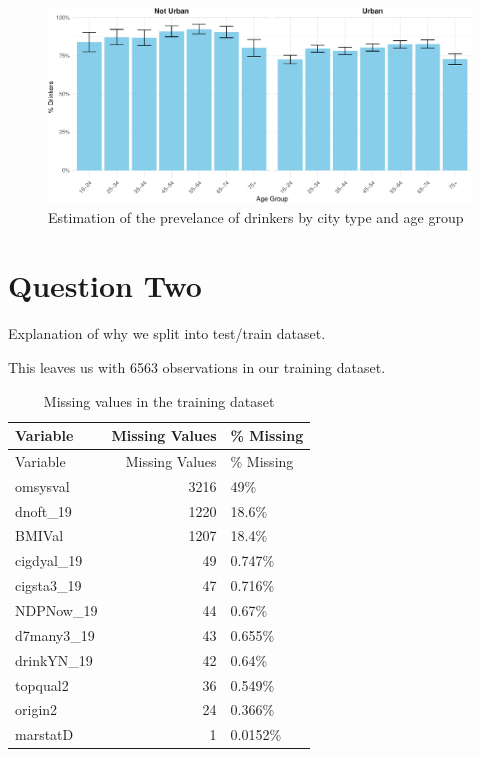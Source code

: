 \documentclass[
  11pt,
]{article}
\begin{document}
\begin{figure}
\centering
\includegraphics{Coursework_files/figure-latex/output prevelance plot-1.pdf}
\caption{Estimation of the prevelance of drinkers by city type and age
group}
\end{figure}

\section{Question Two}\label{question-two}

Explanation of why we split into test/train dataset.

This leaves us with 6563 observations in our training dataset.

\begin{longtable}[]{@{}lrl@{}}
\caption{Missing values in the training dataset}\tabularnewline
\toprule\noalign{}
Variable & Missing Values & \% Missing \\
\midrule\noalign{}
\endfirsthead
\toprule\noalign{}
Variable & Missing Values & \% Missing \\
\midrule\noalign{}
\endhead
\bottomrule\noalign{}
\endlastfoot
omsysval & 3216 & 49\% \\
dnoft\_19 & 1220 & 18.6\% \\
BMIVal & 1207 & 18.4\% \\
cigdyal\_19 & 49 & 0.747\% \\
cigsta3\_19 & 47 & 0.716\% \\
NDPNow\_19 & 44 & 0.67\% \\
d7many3\_19 & 43 & 0.655\% \\
drinkYN\_19 & 42 & 0.64\% \\
topqual2 & 36 & 0.549\% \\
origin2 & 24 & 0.366\% \\
marstatD & 1 & 0.0152\% \\
\end{longtable}
\end{document}
